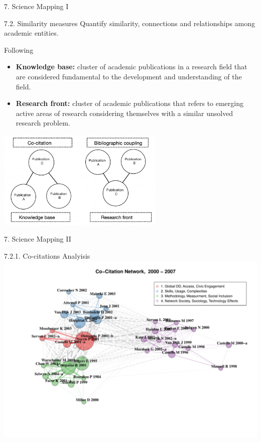 \documentclass[
  ignorenonframetext,
]{beamer}
\begin{document}
\begin{frame}{7. Science Mapping I}
\protect\hypertarget{science-mapping-i}{}
\begin{block}{7.2. Similarity measures}
\protect\hypertarget{similarity-measures}{}
Quantify similarity, connections and relationships among academic
entities.

Following \citet{kammerer2021}

\begin{itemize}
\item
  \textbf{Knowledge base:} cluster of academic publications in a
  research field that are considered fundamental to the development and
  understanding of the field.
\item
  \textbf{Research front:} cluster of academic publications that refers
  to emerging active areas of research considering themselves with a
  similar unsolved research problem.
\end{itemize}

\begin{center}
\includegraphics[width=0.6\textwidth]{pic_1.png}
\end{center}
\end{block}
\end{frame}

\begin{frame}{7. Science Mapping II}
\protect\hypertarget{science-mapping-ii}{}
\vspace{0.5cm}

\begin{block}{7.2.1. Co-citations Analyisis}
\protect\hypertarget{co-citations-analyisis}{}
\includegraphics{Presentation_bibliometric_Urbino_may_23_files/figure-beamer/Co_cite_P1-1.pdf}
\end{block}
\end{frame}
\end{document}

